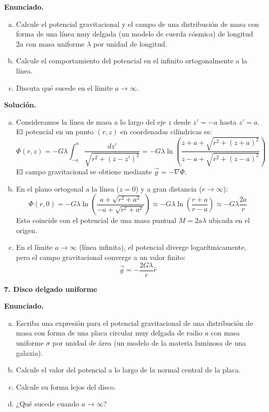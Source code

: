 \textbf{Enunciado.}
\begin{enumerate}[a)]
    \item Calcule el potencial gravitacional y el campo de una distribución de masa con forma de una línea muy delgada (un modelo de cuerda cósmica) de longitud $2a$ con masa uniforme $\lambda$ por unidad de longitud.
    \item Calcule el comportamiento del potencial en el infinito ortogonalmente a la línea.
    \item Discuta qué sucede en el límite $a \to \infty$.
\end{enumerate}

\textbf{Solución.}
\begin{enumerate}[a)]
    \item Consideramos la línea de masa a lo largo del eje $z$ desde $z'=-a$ hasta $z'=a$. El potencial en un punto $(r, z)$ en coordenadas cilíndricas es:
    $$ \Phi(r, z) = -G\lambda \int_{-a}^a \frac{dz'}{\sqrt{r^2 + (z-z')^2}} = -G\lambda \ln \left( \frac{z+a + \sqrt{r^2+(z+a)^2}}{z-a + \sqrt{r^2+(z-a)^2}} \right) $$
    El campo gravitacional se obtiene mediante $\vec{g} = -\nabla \Phi$.

    \item En el plano ortogonal a la línea ($z=0$) y a gran distancia ($r \to \infty$):
    $$ \Phi(r, 0) = -G\lambda \ln \left( \frac{a + \sqrt{r^2+a^2}}{-a + \sqrt{r^2+a^2}} \right) \approx -G\lambda \ln \left( \frac{r+a}{r-a} \right) \approx -G\lambda \frac{2a}{r} $$
    Esto coincide con el potencial de una masa puntual $M = 2a\lambda$ ubicada en el origen.

    \item En el límite $a \to \infty$ (línea infinita), el potencial diverge logarítmicamente, pero el campo gravitacional converge a un valor finito:
    $$ \vec{g} = -\frac{2G\lambda}{r} \hat{r} $$
\end{enumerate}

\medskip
{\large\bfseries 7. Disco delgado uniforme\par}
\smallskip

\textbf{Enunciado.}
\begin{enumerate}[a)]
    \item Escriba una expresión para el potencial gravitacional de una distribución de masa con forma de una placa circular muy delgada de radio $a$ con masa uniforme $\sigma$ por unidad de área (un modelo de la materia luminosa de una galaxia).
    \item Calcule el valor del potencial a lo largo de la normal central de la placa.
    \item Calcule su forma lejos del disco.
    \item ¿Qué sucede cuando $a \to \infty$?
\end{enumerate}

